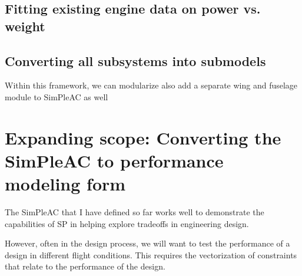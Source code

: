 \subsection{Fitting existing engine data on power vs. weight}

\subsection{Converting all subsystems into submodels}

Within this framework, we can modularize also add a separate wing and fuselage module to
SimPleAC as well

\section{Expanding scope: Converting the SimPleAC to performance modeling form}

The SimPleAC that I have defined so far works well to demonstrate the
capabilities of \gls{SP} in helping explore tradeoffs in engineering design.

However, often in the design process, we will want to test the performance of a
design in different flight conditions. This requires the vectorization of 
constraints that relate to the performance of the design. 